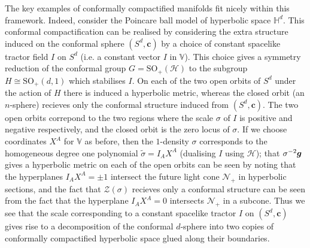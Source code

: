 \documentclass[a4paper,12pt]{amsart}
\newcommand{\cZ}{\mathcal{Z}}
\newcommand{\cc}{\boldsymbol{c}}
\def\cH{\mathcal{H}}
\def\bg{\mbox{\boldmath $g$}}
\newcommand{\si}{\sigma}
\theoremstyle{remark}
\begin{document}

The key examples of conformally compactified manifolds fit nicely
within this framework. Indeed, consider the Poincare ball model of
hyperbolic space $\mathbb{H}^d$. This conformal compactification can
be realised by considering the extra structure induced on the
conformal sphere $(S^d,\cc)$ by a choice of constant spacelike tractor
field $I$ on $S^d$ (i.e. a constant vector $I$ in $\mathbb{V}$). This
choice gives a symmetry reduction of the conformal group
$G=\mathrm{SO}_+(\cH)$ to the subgroup $H\cong \mathrm{SO}_+(d,1)$
which stabilises $I$. On each of the two open orbits of $S^d$ under
the action of $H$ there is induced a hyperbolic metric, whereas the
closed orbit (an $n$-sphere) recieves only the conformal structure
induced from $(S^d,\cc)$. The two open orbits correpond to the two
regions where the scale $\sigma$ of $I$ is positive and negative
respectively, and the closed orbit is the zero locus of $\sigma$. If
we choose coordinates $X^A$ for $\mathbb{V}$ as before, then the
$1$-density $\sigma$ corresponds to the homogeneous degree one
polynomial $\tilde{\si}= I_A X^A$ (dualising $I$ using $\cH$); that
$\sigma^{-2}\bg$ gives a hyperbolic metric on each of the open orbits
can be seen by noting that the hyperplanes $I_A X^A=\pm 1$ intersect
the future light cone $\mathcal{N}_+$ in hyperbolic sections, and the
fact that $\cZ(\si)$ recieves only a conformal structure can be seen
from the fact that the hyperplane $I_A X^A=0$ intersects
$\mathcal{N}_+$ in a subcone. Thus we see that the scale corresponding
to a constant spacelike tractor $I$ on $(S^d,\cc)$ gives rise to a
decomposition of the conformal $d$-sphere into two copies of
conformally compactified hyperbolic space glued along their
boundaries.
\end{document}
